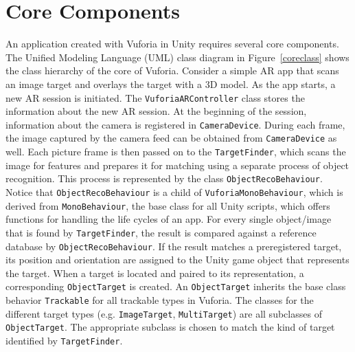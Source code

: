 \section{Core Components}
\begin{figure}[!ht]
\end{figure}

An application created with Vuforia in Unity requires several core components. The Unified Modeling Language (UML) class diagram in Figure~\ref{coreclass} shows the class hierarchy of the core of Vuforia. Consider a simple AR app that scans an image target and overlays the target with a 3D model. As the app starts, a new AR session is initiated. The \texttt{VuforiaARController} class stores the information about the new AR session. At the beginning of the session, information about the camera is registered in \texttt{CameraDevice}. During each frame, the image captured by the camera feed can be obtained from \texttt{CameraDevice} as well. Each picture frame is then passed on to the \texttt{TargetFinder}, which scans the image for features and prepares it for matching using a separate process of object recognition. This process is represented by the class \texttt{ObjectRecoBehaviour}. Notice that \texttt{ObjectRecoBehaviour} is a child of \texttt{VuforiaMonoBehaviour}, which is derived from \texttt{MonoBehaviour}, the base class for all Unity scripts, which offers functions for handling the life cycles of an app. For every single object/image that is found by \texttt{TargetFinder}, the result is compared against a reference database by \texttt{ObjectRecoBehaviour}. If the result matches a preregistered target, its position and orientation are assigned to the Unity game object that represents the target. When a target is located and paired to its representation, a corresponding \texttt{ObjectTarget} is created. An \texttt{ObjectTarget} inherits the base class behavior \texttt{Trackable} for all trackable types in Vuforia. The classes for the different target types (e.g. \texttt{ImageTarget}, \texttt{MultiTarget}) are all subclasses of  \texttt{ObjectTarget}. The appropriate subclass is chosen to match the kind of target identified by \texttt{TargetFinder}.

